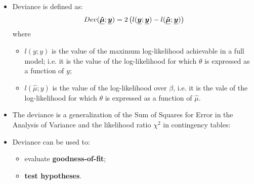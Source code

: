 \begin{frame}
  \begin{itemize}
    \item Deviance is defined as:
      $$ Dev(\boldsymbol{\underline{\hat{\mu}}};\boldsymbol{\underline{y}}) = 2\left(l(\boldsymbol{\underline{y}};\boldsymbol{\underline{y}}) - l(\boldsymbol{\underline{\hat{\mu}}};\boldsymbol{\underline{y}})\right) $$
      where
      \begin{itemize}
        \item $ l(y;y) $ is the value of the maximum log-likelihood achievable in a full model; i.e. it is the value of the log-likelihood for which $ \theta $ is expressed as a function of $ y $;
        \item $ l(\hat{\mu};y) $ is the value of the log-likelihood over $ \beta $, i.e. it is the vale of the log-likelihood for which $ \theta $ is expressed as a function of $ \hat{\mu} $.
      \end{itemize}
    \item The deviance is a generalization of the Sum of Squares for Error in the Analysis of Variance and the likelihood ratio $ \chi^2 $ in contingency tables:
    \item Deviance can be used to:
       \vspace{-0.15cm}
       \begin{itemize}
        \item evaluate \textbf{goodness-of-fit};
        \item \textbf{test hypotheses}.
      \end{itemize}
  \end{itemize}
\end{frame}




